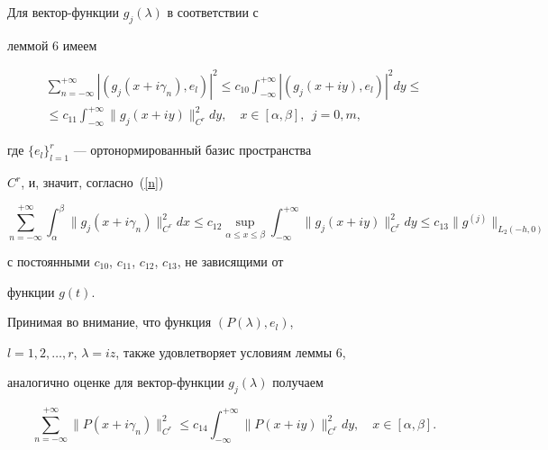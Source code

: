 Для вектор-функции $g_j(\lambda)$ в соответствии с


леммой 6 имеем


\begin{multline*}


\sum\limits_{n=-\infty}^{+\infty}|(g_j(x+i\gamma_n),e_l)|^2


\le c_{10}\int_{-\infty}^{+\infty}|(g_j(x+iy),e_l)|^2dy\le \\


%


\le c_{11}\int_{-\infty}^{+\infty}\|g_j(x+iy)\|_{C^r}^2dy,\quad


x\in[\alpha,\beta],\ \ j=0,m,


\end{multline*}


где $\{e_l\}_{l=1}^r$ --- ортонормированный базис пространства


$C^r$, и, значит, согласно~(\ref{n})


\begin{equation}


\label{r}


\sum\limits_{n=-\infty}^{+\infty}\int_{\alpha}^{\beta}\|g_j(x+i\gamma_n)\|_{C^r}


^2dx\le c_{12}\sup\limits_{\alpha\le x\le\beta}\int_


{-\infty}^{+\infty}\|g_j(x+iy)\|_{C^r}^2dy\le


c_{13}\|g^{(j)}\|_{L_2(-h,0)}


\end{equation}


с постоянными $c_{10}$, $c_{11}$, $c_{12}$, $c_{13}$, не зависящими от


функции $g(t)$.





Принимая во внимание, что функция $(P(\lambda),e_l)$,


$l=1,2,\dotsc,r$, $\lambda=iz$, также удовлетворяет условиям леммы 6,


аналогично оценке для вектор-функции $g_j(\lambda)$ получаем


\begin{equation}


\label{s}


\sum\limits_{n=-\infty}^{+\infty}\|P(x+i\gamma_n)\|_{C^r}^2\le


c_{14}\int_{-\infty}^{+\infty}\|P(x+iy)\|_{C^r}^2dy,


\quad x\in[\alpha,\beta].


\end{equation}


